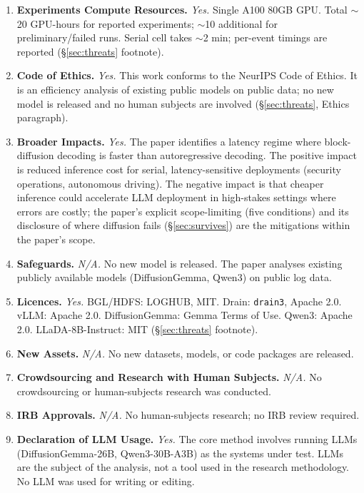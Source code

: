 \begin{enumerate}[leftmargin=2em,label=\arabic*.,itemsep=4pt]
\item \textbf{Experiments Compute Resources.}
\emph{Yes.} Single A100 80GB GPU. Total $\sim$20 GPU-hours for
reported experiments; $\sim$10 additional for preliminary/failed runs.
Serial cell takes $\sim$2 min; per-event timings are reported
(\S\ref{sec:threats} footnote).

\item \textbf{Code of Ethics.}
\emph{Yes.} This work conforms to the NeurIPS Code of Ethics. It is an
efficiency analysis of existing public models on public data; no new
model is released and no human subjects are involved
(\S\ref{sec:threats}, Ethics paragraph).

\item \textbf{Broader Impacts.}
\emph{Yes.} The paper identifies a latency regime where block-diffusion
decoding is faster than autoregressive decoding. The positive impact is
reduced inference cost for serial, latency-sensitive deployments
(security operations, autonomous driving). The negative impact is that
cheaper inference could accelerate LLM deployment in high-stakes
settings where errors are costly; the paper's explicit scope-limiting
(five conditions) and its disclosure of where diffusion fails
(\S\ref{sec:survives}) are the mitigations within the paper's scope.

\item \textbf{Safeguards.}
\emph{N/A.} No new model is released. The paper analyses existing
publicly available models (DiffusionGemma, Qwen3) on public log data.

\item \textbf{Licences.}
\emph{Yes.} BGL/HDFS: LOGHUB, MIT. Drain: \texttt{drain3}, Apache 2.0.
vLLM: Apache 2.0. DiffusionGemma: Gemma Terms of Use. Qwen3:
Apache 2.0. LLaDA-8B-Instruct: MIT (\S\ref{sec:threats} footnote).

\item \textbf{New Assets.}
\emph{N/A.} No new datasets, models, or code packages are released.

\item \textbf{Crowdsourcing and Research with Human Subjects.}
\emph{N/A.} No crowdsourcing or human-subjects research was conducted.

\item \textbf{IRB Approvals.}
\emph{N/A.} No human-subjects research; no IRB review required.

\item \textbf{Declaration of LLM Usage.}
\emph{Yes.} The core method involves running LLMs (DiffusionGemma-26B,
Qwen3-30B-A3B) as the systems under test. LLMs are the subject of the
analysis, not a tool used in the research methodology. No LLM was used
for writing or editing.

\end{enumerate}
